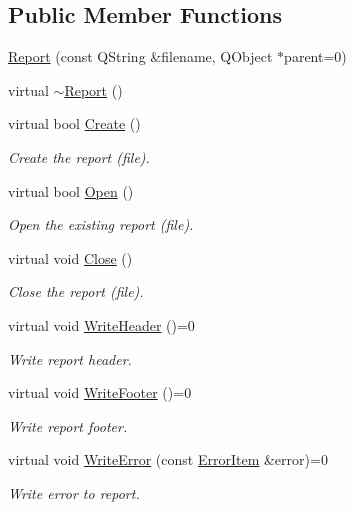 \subsection*{Public Member Functions}
\begin{DoxyCompactItemize}
\item 
\hyperlink{class_report_aa37e9518eea3f7f034db8ce23912ea63}{Report} (const Q\-String \&filename, Q\-Object $\ast$parent=0)
\item 
virtual \hyperlink{class_report_a93a2634da7bc52b01c39022d3639383b}{$\sim$\-Report} ()
\item 
virtual bool \hyperlink{class_report_a88760dc5f1c98b8c32ffc41c3591bb46}{Create} ()
\begin{DoxyCompactList}\small\item\em Create the report (file). \end{DoxyCompactList}\item 
virtual bool \hyperlink{class_report_a58abe284bf88f1ac50a8d4a08991a383}{Open} ()
\begin{DoxyCompactList}\small\item\em Open the existing report (file). \end{DoxyCompactList}\item 
virtual void \hyperlink{class_report_a06919454df7562f1d4fa6e57bf44f57b}{Close} ()
\begin{DoxyCompactList}\small\item\em Close the report (file). \end{DoxyCompactList}\item 
virtual void \hyperlink{class_report_abff44ec133e16b06ee1d4232f1142d0a}{Write\-Header} ()=0
\begin{DoxyCompactList}\small\item\em Write report header. \end{DoxyCompactList}\item 
virtual void \hyperlink{class_report_a9c0d8bf828c36444c2b464f2227005c6}{Write\-Footer} ()=0
\begin{DoxyCompactList}\small\item\em Write report footer. \end{DoxyCompactList}\item 
virtual void \hyperlink{class_report_adcef6595b7f9c402ba9f23b9c1a1559f}{Write\-Error} (const \hyperlink{class_error_item}{Error\-Item} \&error)=0
\begin{DoxyCompactList}\small\item\em Write error to report. \end{DoxyCompactList}\end{DoxyCompactItemize}
